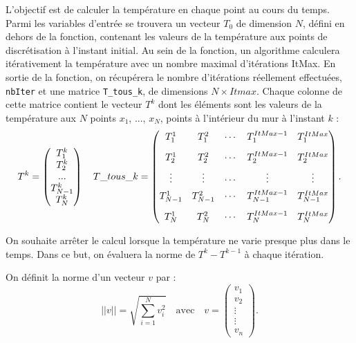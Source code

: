 \ifprof
\else
L'objectif est de calculer la température en chaque point au cours du temps. Parmi les variables
d'entrée se trouvera un vecteur $T_0$ de dimension $N$, défini en dehors de la fonction,
 contenant les valeurs de la température aux points de discrétisation à l'instant initial. 
 Au sein de la fonction, un algorithme calculera itérativement la température avec un 
 nombre maximal d'itérations ItMax. En sortie de la fonction, on récupérera le nombre 
 d'itérations réellement effectuées, \texttt{nbIter} et une matrice \texttt{T\_tous\_k}, de
  dimensions $N\times Itmax$.  Chaque colonne de cette matrice contient le vecteur $T^k$
   dont les éléments sont les valeurs de la température aux $N$ points $x_1$, ..., $x_N$, 
 points à l'intérieur du mur à l'instant $k$ :
$$
T^k = \begin{pmatrix} T_1^k \\  T_2 ^k \\ ... \\  T_{N-1}^{k} \\ T_{N}^{k}  \end{pmatrix}
\quad
T\_tous\_k = 
\begin{pmatrix} 
T_1^1   & T_1^2  & \cdots & T_1^{ItMax-1} & T_{1}^{ItMax} \vspace{0.3cm} \\
T_2^1   & T_2^2  & \cdots & T_2^{ItMax-1} & T_2^{ItMax }  \vspace{0.15cm}\\
\vdots & \vdots & \cdots & \vdots & \vdots \vspace{0.15cm}\\
T_{N-1}^1   & T_{N-1}^2  & \cdots & T_{N-1}^{ItMax-1} & T_{N-1}^{ItMax} \vspace{0.3cm} \\
T_{N}^1   & T_{N}^2  & \cdots & T_{N}^{ItMax-1} & T_{N}^{ItMax}  \\
 \end{pmatrix}.
$$


On souhaite arrêter le calcul lorsque la température ne varie presque plus dans le temps. 
Dans ce but, on évaluera la norme  de $T^k - T^{k-1}$ à chaque itération. 
\begin{defi}
On définit la norme d'un vecteur $v$ par : 
$$
||v|| = \sqrt{\sum\limits_{i=1}^{N}v_i^2} \quad \text{avec} \quad v=
\begin{pmatrix} v_1 \\ v_2 \\ \vdots \\ \vdots \\ v_n \end{pmatrix}.
$$
\end{defi}


